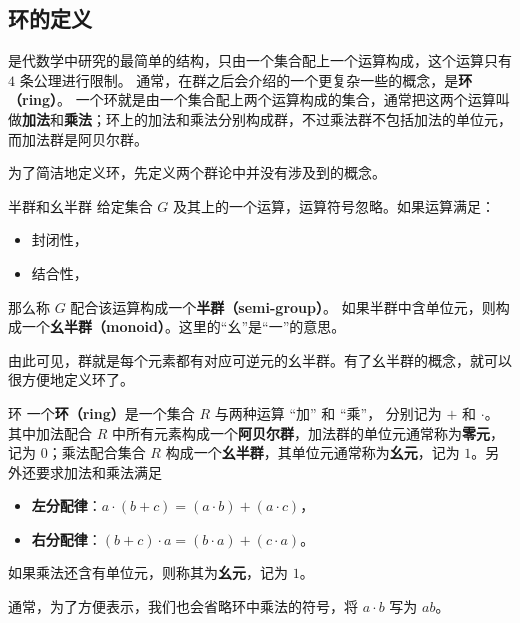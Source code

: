


\subsection{环的定义}
是代数学中研究的最简单的结构，只由一个集合配上一个运算构成，这个运算只有 $4$ 条公理进行限制。 通常，在群之后会介绍的一个更复杂一些的概念，是\textbf{环（ring）}。 一个环就是由一个集合配上两个运算构成的集合，通常把这两个运算叫做\textbf{加法}和\textbf{乘法}；环上的加法和乘法分别构成群，不过乘法群不包括加法的单位元，而加法群是阿贝尔群。

为了简洁地定义环，先定义两个群论中并没有涉及到的概念。

\begin{definition}{半群和幺半群}\label{def_Ring_1}
给定集合 $G$ 及其上的一个运算，运算符号忽略。如果运算满足：
\begin{itemize}
\item 封闭性，
\item 结合性，
\end{itemize}
那么称 $G$ 配合该运算构成一个\textbf{半群（semi-group）}。
如果半群中含单位元，则构成一个\textbf{幺半群（monoid）}。这里的“幺”是“一”的意思。
\end{definition}

由此可见，群就是每个元素都有对应可逆元的幺半群。有了幺半群的概念，就可以很方便地定义环了。

\begin{definition}{环}\label{def_Ring_2}
一个\textbf{环（ring）}是一个集合 $R$ 与两种运算 “加” 和 “乘”， 分别记为 $+$ 和 $\cdot$。 其中加法配合 $R$ 中所有元素构成一个\textbf{阿贝尔群}，加法群的单位元通常称为\textbf{零元}，记为 $0$；乘法配合集合 $R$ 构成一个\textbf{幺半群}，其单位元通常称为\textbf{幺元}，记为 $1$。另外还要求加法和乘法满足
\begin{itemize}
\item \textbf{左分配律}：$a \cdot (b + c) = (a \cdot b) + (a \cdot c)$，
\item \textbf{右分配律}：$(b + c) \cdot a = (b \cdot a) + (c \cdot a)$。
\end{itemize}
如果乘法还含有单位元，则称其为\textbf{幺元}，记为 $1$。
\end{definition}

通常，为了方便表示，我们也会省略环中乘法的符号，将 $a\cdot b$ 写为 $ab$。


